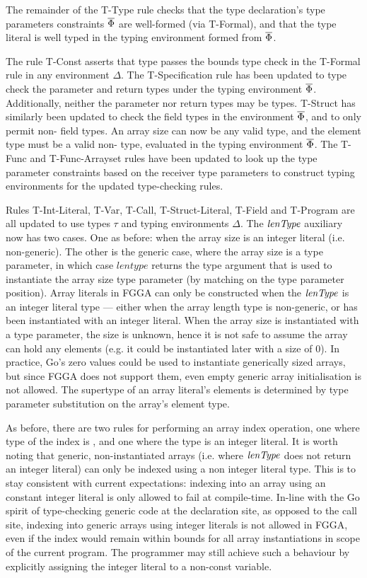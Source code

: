 The remainder of the T-Type rule checks that the type declaration's type
parameters constraints $\overline{\Phi}$ are well-formed (via T-Formal), and that the
type literal is well typed in the typing environment formed from $\overline{\Phi}$.

The rule T-Const asserts that  type passes the bounds type check in
the T-Formal rule in any environment $\Delta$. The T-Specification rule has been
updated to type check the parameter and return types under the typing
environment $\overline{\Phi}$. Additionally, neither the parameter nor return types
may be  types. T-Struct has similarly been updated to check the field
types in the environment $\overline{\Phi}$, and to only permit non- field
types. An array size can now be any valid  type, and the element type
must be a valid non- type, evaluated in the typing environment
$\overline{\Phi}$. The T-Func and T-Func-Arrayset rules have been updated to look up
the type parameter constraints based on the receiver type parameters to
construct typing environments for the updated type-checking rules.

Rules T-Int-Literal, T-Var, T-Call, T-Struct-Literal, T-Field and T-Program are
all updated to use types $\tau$ and typing environments $\Delta$. The $\mathit{lenType}$
auxiliary now has two cases. One as before: when the array size is an integer
literal (i.e. non-generic). The other is the generic case, where the array size
is a type parameter, in which case $lentype$ returns the type argument that is
used to instantiate the array size type parameter (by matching on the type
parameter position). Array literals in FGGA can only be constructed when the
$\mathit{lenType}$ is an integer literal type --- either when the array length type is
non-generic, or has been instantiated with an integer literal. When the array
size is instantiated with a type parameter, the size is unknown, hence it is not
safe to assume the array can hold any elements (e.g. it could be instantiated
later with a size of 0). In practice, Go's zero values could be used to
instantiate generically sized arrays, but since FGGA does not support them, even
empty generic array initialisation is not allowed. The supertype of an array
literal's elements is determined by type parameter substitution on the array's
element type.

As before, there are two rules for performing an array index operation, one
where type of the index is , and one where the type is an integer
literal. It is worth noting that generic, non-instantiated arrays (i.e. where
$\mathit{lenType}$ does not return an integer literal) can only be indexed using a non
integer literal  type. This is to stay consistent with current
expectations: indexing into an array using an constant integer literal is only
allowed to fail at compile-time. In-line with the Go spirit of type-checking
generic code at the declaration site, as opposed to the call site, indexing
into generic arrays using integer literals is not allowed in FGGA, even if the
index would remain within bounds for all array instantiations in scope of the
current program. The programmer may still achieve such a behaviour by explicitly
assigning the integer literal to a non-const  variable.



